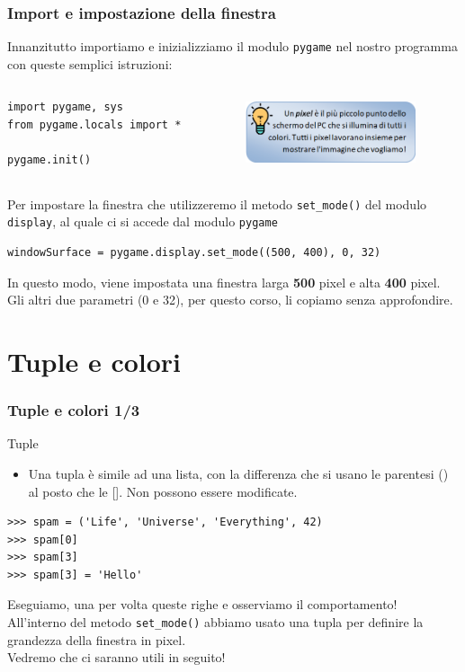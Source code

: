 \documentclass{beamer}
\begin{document}
\begin{frame}[fragile]
\frametitle{Import e impostazione della finestra}
Innanzitutto importiamo e inizializziamo il modulo \texttt{pygame} nel nostro programma con queste semplici istruzioni:
\begin{columns}[T]
	\begin{column}[T]{0.55\textwidth}
		\begin{lstlisting}
import pygame, sys
from pygame.locals import *
		
pygame.init()
		\end{lstlisting}
	\end{column}
	\begin{column}[T]{0.45\textwidth}
		\begin{figure}[t]
			\includegraphics[height=2cm, width=5cm]{images/pixel.png}
		\end{figure}
	\end{column}
\end{columns}
Per impostare la finestra che utilizzeremo il metodo \texttt{set\_mode()} del modulo \texttt{display}, al quale ci si accede dal modulo \texttt{pygame}
\begin{lstlisting}
windowSurface = pygame.display.set_mode((500, 400), 0, 32)
\end{lstlisting}
In questo modo, viene impostata una finestra larga \textbf{500} pixel e alta \textbf{400} pixel. Gli altri due parametri (0 e 32), per questo corso, li copiamo senza approfondire.
\end{frame}

\section{Tuple e colori}

\begin{frame}[fragile]
\frametitle{Tuple e colori 1/3}
	\begin{block}{Tuple}
		\begin{itemize}
			\item Una tupla è simile ad una lista, con la differenza che si usano le parentesi () al posto che le []. Non possono essere modificate.
		\end{itemize}
	\end{block}
\begin{lstlisting}
>>> spam = ('Life', 'Universe', 'Everything', 42)
>>> spam[0]
>>> spam[3]
>>> spam[3] = 'Hello'
\end{lstlisting}
Eseguiamo, una per volta queste righe e osserviamo il comportamento!\\
All'interno del metodo \texttt{set\_mode()} abbiamo usato una tupla per definire la grandezza della finestra in pixel.\\
Vedremo che ci saranno utili in seguito!
\end{frame}
\end{document}
